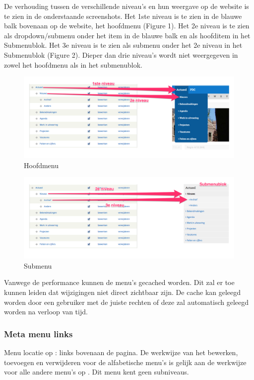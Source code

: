 De verhouding tussen de verschillende niveau's en hun weergave op de website is te zien in de onderstaande screenshots. Het 1ste niveau is te zien in de blauwe balk bovenaan op de website, het hoofdmenu (Figure 1). Het 2e niveau is te zien als dropdown/submenu onder het item in de blauwe balk en als hoofditem in het Submenublok. Het 3e niveau is te zien als submenu onder het 2e niveau in het Submenublok (Figure 2). Dieper dan drie niveau's wordt niet weergegeven in zowel het hoofdmenu als in het submenublok.

\begin{figure}[h!]
  \includegraphics[width=\textwidth]{img/menu_mainmenu.png}
  \caption{Hoofdmenu}
\end{figure}

\begin{figure}[h!]
  \includegraphics[width=\textwidth]{img/menu_submenu.png}
  \caption{Submenu}
\end{figure}

\bigskip

Vanwege de performance kunnen de menu's gecached worden. Dit zal er toe kunnen leiden dat wijzigingen niet direct zichtbaar zijn. De cache kan geleegd worden door een gebruiker met de juiste rechten of deze zal automatisch geleegd worden na verloop van tijd.

\bigskip

\subsubsection{Meta menu links}\label{metamenulinks}
Menu locatie op \drupalpath{}: links bovenaan de pagina. De werkwijze van het bewerken, toevoegen en verwijderen voor de alfabetische menu's is gelijk aan de werkwijze voor alle andere menu's op \drupalpath{}. Dit menu kent geen subniveaus.
\bigskip

